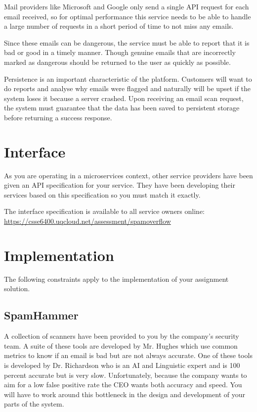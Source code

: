 \documentclass{csse4400}
\begin{document}
Mail providers like Microsoft and Google only send a single API request for each email received, so for optimal performance this service needs to be able to handle a large number of requests in a short period of time to not miss any emails.

Since these emails can be dangerous, the service must be able to report that it is bad or good in a timely manner. Though genuine emails that are incorrectly marked as dangerous should be returned to the user as quickly as possible.

Persistence is an important characteristic of the platform. Customers will want to do reports and analyse why emails were flagged and naturally will be upset if the system loses it because a server crashed. Upon receiving an email scan request, the system must guarantee that the data has been saved to persistent storage before returning a success response.

\section{Interface}
As you are operating in a microservices context, other service providers have been given an API specification for your service. They have been developing their services based on this specification so you must match it exactly.

The interface specification is available to all service owners online: \url{https://csse6400.uqcloud.net/assessment/spamoverflow}

\section{Implementation}
The following constraints apply to the implementation of your assignment solution.

\subsection{SpamHammer}

A collection of scanners have been provided to you by the company's security team. A suite of these tools are developed by Mr. Hughes which use common metrics to know if an email is bad but are not always accurate. One of these tools is developed by Dr. Richardson who is an AI and Linguistic expert and is 100 percent accurate but is very slow. Unfortunately, because the company wants to aim for a low false positive rate the CEO wants both accuracy and speed. You will have to work around this bottleneck in the design and development of your parts of the system.
\end{document}
